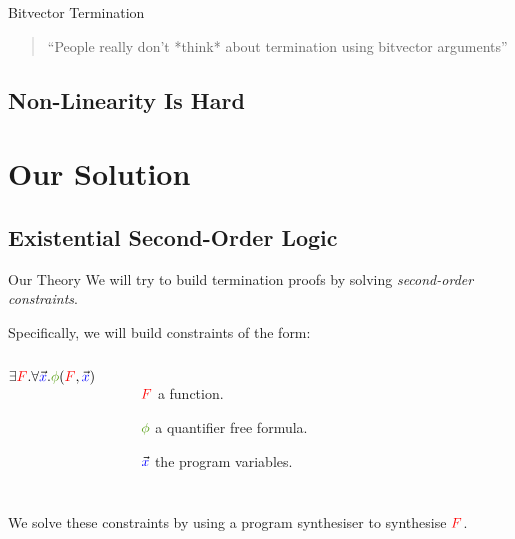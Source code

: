 \documentclass[xcolor=pdftex,t,11pt]{beamer}
\newcommand{\red}[1]{\textcolor{red}{#1}}
\newcommand{\blue}[1]{\textcolor{blue}{#1}}
\newcommand{\green}[1]{\textcolor{ta3chameleon}{#1}}
\begin{document}
\begin{frame}{Bitvector Termination}
\begin{quote}
 ``People really don't *think* about termination using bitvector arguments''
   \hspace*{}
\end{quote}
\end{frame}


\subsection{Non-Linearity Is Hard}


\section{Our Solution}

\subsection{Existential Second-Order Logic}

\begin{frame}[fragile]{Our Theory}
 We will try to build termination proofs by solving \emph{second-order constraints}.

 \vspace{1em}

 Specifically, we will build constraints of the form:

 \begin{center}
 \begin{columns}
  $\exists \red{F} . \forall \vec{\blue{x}} . \green{\phi}(\red{F}, \vec{\blue{x}})$

  \begin{minipage}{\textwidth}
 \begin{itemize}
  \item[$\red{F}$] a function.
  \item[$\green{\phi}$] a quantifier free formula.
  \item[$\vec{\blue{x}}$] the program variables.
 \end{itemize}
 \end{minipage}
 \end{columns}

 \end{center}

 \vspace{.75em}

 We solve these constraints by using a program synthesiser to synthesise $\red{F}$\footnotemark.
 
\end{frame}
\end{document}
